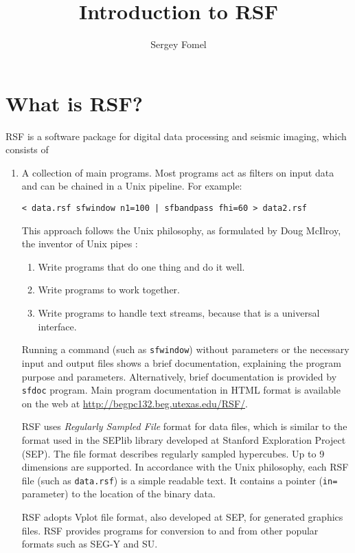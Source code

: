 \title{Introduction to RSF}
\author{Sergey Fomel}

\maketitle

\section{What is RSF?}

RSF is a software package for digital data processing and seismic imaging,
which consists of
\begin{enumerate}
\item A collection of main programs. Most programs act as filters on input
  data and can be chained in a Unix pipeline. For example:
\begin{verbatim}
< data.rsf sfwindow n1=100 | sfbandpass fhi=60 > data2.rsf
\end{verbatim}
This approach follows the Unix philosophy, as formulated by Doug McIlroy,
the inventor of Unix pipes \cite[]{salus}:
\begin{enumerate}
\item Write programs that do one thing and do it well. 
\item Write programs to work together. 
\item Write programs to handle text streams, because that is a universal
  interface.
\end{enumerate}

Running a command (such as \texttt{sfwindow}) without parameters or the
necessary input and output files shows a brief documentation, explaining the
program purpose and parameters.  Alternatively, brief documentation is
provided by \texttt{sfdoc} program. Main program documentation in HTML format
is available on the web at \url{http://begpc132.beg.utexas.edu/RSF/}.

RSF uses \emph{Regularly Sampled File} format for data files, which is similar
to the format used in the SEPlib library developed at Stanford Exploration
Project (SEP). The file format describes regularly sampled hypercubes. Up to 9
dimensions are supported. In accordance with the Unix philosophy, each RSF
file (such as \texttt{data.rsf}) is a simple readable text. It contains a
pointer (\texttt{in=} parameter) to the location of the binary data. 

RSF adopts Vplot file format, also developed at SEP, for generated graphics
files. RSF provides programs for conversion to and from other popular formats
such as SEG-Y and SU.


\end{enumerate}
